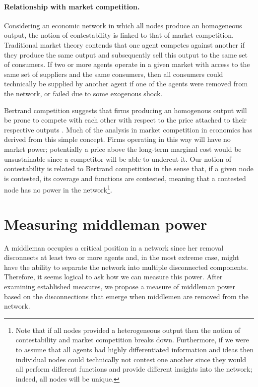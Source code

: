 \documentclass[11pt,fleqn]{article}
\begin{document}
\paragraph{Relationship with market competition.}

Considering an economic network in which all nodes produce an homogeneous output, the notion of contestability is linked to that of market competition. Traditional market theory contends that one agent competes against another if they produce the same output and subsequently sell this output to the same set of consumers. If two or more agents operate in a given market with access to the same set of suppliers and the same consumers, then all consumers could technically be supplied by another agent if one of the agents were removed from the network, or failed due to some exogenous shock.

Bertrand competition suggests that firms producing an homogenous output will be prone to compete with each other with respect to the price attached to their respective outputs \citep{Edgeworth1881}. Much of the analysis in market competition in economics has derived from this simple concept. Firms operating in this way will have no market power; potentially a price above the long-term marginal cost would be unsustainable since a competitor will be able to undercut it. Our notion of contestability is related to Bertrand competition in the sense that, if a given node is contested, its coverage and functions are contested, meaning that a contested node has no power in the network\footnote{Note that if all nodes provided a heterogeneous output then the notion of contestability and market competition breaks down. Furthermore, if we were to assume that all agents had highly differentiated information and ideas then individual nodes could technically not contest one another since they would all perform different functions and provide different insights into the network; indeed, all nodes will be unique.}.

\section{Measuring middleman power}
\label{sec:middlemanPower}

A middleman occupies a critical position in a network since her removal disconnects at least two or more agents and, in the most extreme case, might have the ability to separate the network into multiple disconnected components. Therefore, it seems logical to ask how we can measure this power. After examining established measures, we propose a measure of middleman power based on the disconnections that emerge when middlemen are removed from the network.
\end{document}
